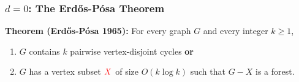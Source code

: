 \documentclass{beamer}
\begin{document}
\begin{frame}
  \frametitle{$d=0$: The Erdős-Pósa Theorem}

    \noindent\textbf{Theorem (Erdős-Pósa 1965):}
    For every graph $G$ and every integer $k\ge 1$,
    \begin{enumerate}%
      \item $G$ contains $k$ pairwise vertex-disjoint cycles \textbf{or}
      \item $G$ has a vertex subset $\mathcolor{red}{X}$ of size $O(k\log k)$ such that $G-X$ is a forest. 
    \end{enumerate}
    \begin{center}

\end{center}
\end{frame}
\end{document}
